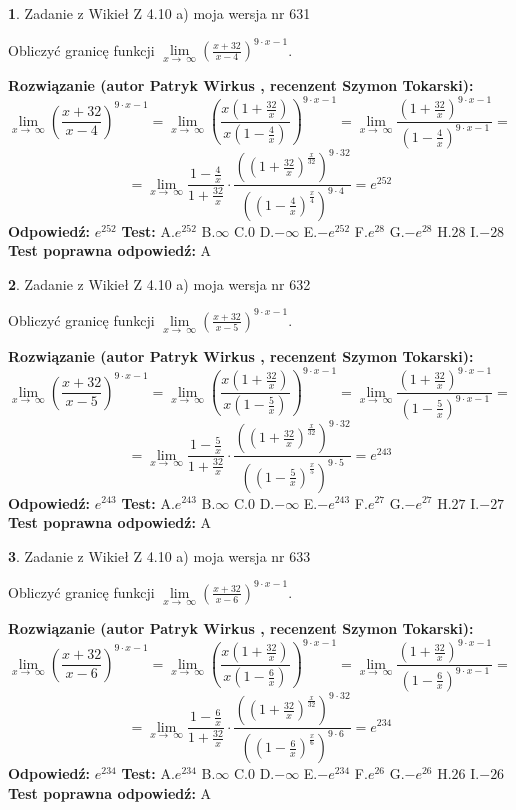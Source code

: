 \documentclass[12pt, a4paper]{article}
\theoremstyle{definition} %
\newtheorem{zad}{}
\newcommand{\zadStart}[1]{\begin{zad}#1\newline}
\newcommand{\zadStop}{\end{zad}}
\newcommand{\rozwStart}[2]{\noindent \textbf{Rozwiązanie (autor #1 , recenzent #2): }\newline}
\newcommand{\rozwStop}{\newline}
\newcommand{\odpStart}{\noindent \textbf{Odpowiedź:}\newline}
\newcommand{\odpStop}{\newline}
\newcommand{\testStart}{\noindent \textbf{Test:}\newline}
\newcommand{\testStop}{\newline}
\newcommand{\kluczStart}{\noindent \textbf{Test poprawna odpowiedź:}\newline}
\newcommand{\kluczStop}{\newline}
\begin{document}
\zadStart{Zadanie z Wikieł Z 4.10 a) moja wersja nr 631}

Obliczyć granicę funkcji  $\lim\limits_{x\to\ \infty}(\frac{x+32}{x-4})^{9\cdot x-1}$.
\zadStop
\rozwStart{Patryk Wirkus}{Szymon Tokarski}
$$\lim\limits_{x\to\ \infty}(\frac{x+32}{x-4})^{9\cdot x-1} = \lim\limits_{x\to\ \infty}(\frac{x(1+\frac{32}{x})}{x(1-\frac{4}{x})})^{9\cdot x-1}=\lim\limits_{x\to\ \infty}\frac{(1+\frac{32}{x})^{9\cdot x-1}}{(1-\frac{4}{x})^{9\cdot x-1}}=$$
$$=\lim\limits_{x\to\ \infty}\frac{1-\frac{4}{x}}{1+\frac{32}{x}}\cdot\frac{((1+\frac{32}{x})^{\frac{x}{32}})^{9\cdot32}}{((1-\frac{4}{x})^{\frac{x}{4}})^{9\cdot4}}=e^{252}$$
\rozwStop
\odpStart
$e^{252}$
\odpStop
\testStart
A.$e^{252}$ B.$\infty$ C.$0$ D.$-\infty$ E.$-e^{252}$
F.$e^{28}$ G.$-e^{28}$
H.$28$
I.$-28$
\testStop
\kluczStart
A
\kluczStop



\zadStart{Zadanie z Wikieł Z 4.10 a) moja wersja nr 632}

Obliczyć granicę funkcji  $\lim\limits_{x\to\ \infty}(\frac{x+32}{x-5})^{9\cdot x-1}$.
\zadStop
\rozwStart{Patryk Wirkus}{Szymon Tokarski}
$$\lim\limits_{x\to\ \infty}(\frac{x+32}{x-5})^{9\cdot x-1} = \lim\limits_{x\to\ \infty}(\frac{x(1+\frac{32}{x})}{x(1-\frac{5}{x})})^{9\cdot x-1}=\lim\limits_{x\to\ \infty}\frac{(1+\frac{32}{x})^{9\cdot x-1}}{(1-\frac{5}{x})^{9\cdot x-1}}=$$
$$=\lim\limits_{x\to\ \infty}\frac{1-\frac{5}{x}}{1+\frac{32}{x}}\cdot\frac{((1+\frac{32}{x})^{\frac{x}{32}})^{9\cdot32}}{((1-\frac{5}{x})^{\frac{x}{5}})^{9\cdot5}}=e^{243}$$
\rozwStop
\odpStart
$e^{243}$
\odpStop
\testStart
A.$e^{243}$ B.$\infty$ C.$0$ D.$-\infty$ E.$-e^{243}$
F.$e^{27}$ G.$-e^{27}$
H.$27$
I.$-27$
\testStop
\kluczStart
A
\kluczStop



\zadStart{Zadanie z Wikieł Z 4.10 a) moja wersja nr 633}

Obliczyć granicę funkcji  $\lim\limits_{x\to\ \infty}(\frac{x+32}{x-6})^{9\cdot x-1}$.
\zadStop
\rozwStart{Patryk Wirkus}{Szymon Tokarski}
$$\lim\limits_{x\to\ \infty}(\frac{x+32}{x-6})^{9\cdot x-1} = \lim\limits_{x\to\ \infty}(\frac{x(1+\frac{32}{x})}{x(1-\frac{6}{x})})^{9\cdot x-1}=\lim\limits_{x\to\ \infty}\frac{(1+\frac{32}{x})^{9\cdot x-1}}{(1-\frac{6}{x})^{9\cdot x-1}}=$$
$$=\lim\limits_{x\to\ \infty}\frac{1-\frac{6}{x}}{1+\frac{32}{x}}\cdot\frac{((1+\frac{32}{x})^{\frac{x}{32}})^{9\cdot32}}{((1-\frac{6}{x})^{\frac{x}{6}})^{9\cdot6}}=e^{234}$$
\rozwStop
\odpStart
$e^{234}$
\odpStop
\testStart
A.$e^{234}$ B.$\infty$ C.$0$ D.$-\infty$ E.$-e^{234}$
F.$e^{26}$ G.$-e^{26}$
H.$26$
I.$-26$
\testStop
\kluczStart
A
\kluczStop
\end{document}
